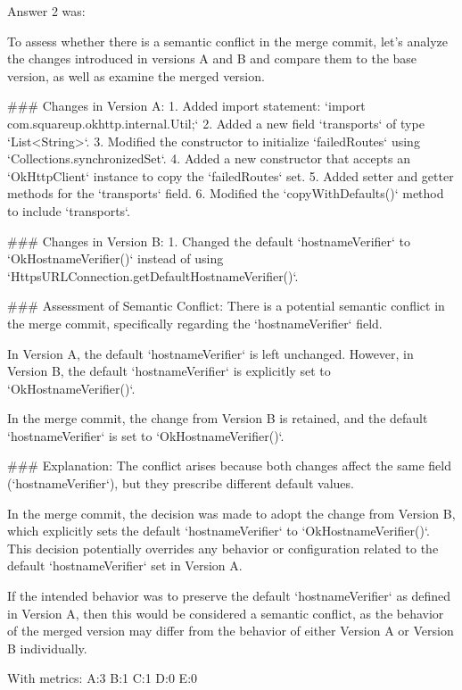 Answer 2 was:
\begin{spverbatim}
To assess whether there is a semantic conflict in the merge commit, let's analyze the changes introduced in versions A and B and compare them to the base version, as well as examine the merged version.

### Changes in Version A:
1. Added import statement: `import com.squareup.okhttp.internal.Util;`
2. Added a new field `transports` of type `List<String>`.
3. Modified the constructor to initialize `failedRoutes` using `Collections.synchronizedSet`.
4. Added a new constructor that accepts an `OkHttpClient` instance to copy the `failedRoutes` set.
5. Added setter and getter methods for the `transports` field.
6. Modified the `copyWithDefaults()` method to include `transports`.

### Changes in Version B:
1. Changed the default `hostnameVerifier` to `OkHostnameVerifier()` instead of using `HttpsURLConnection.getDefaultHostnameVerifier()`.

### Assessment of Semantic Conflict:
There is a potential semantic conflict in the merge commit, specifically regarding the `hostnameVerifier` field.

In Version A, the default `hostnameVerifier` is left unchanged. However, in Version B, the default `hostnameVerifier` is explicitly set to `OkHostnameVerifier()`.

In the merge commit, the change from Version B is retained, and the default `hostnameVerifier` is set to `OkHostnameVerifier()`.

### Explanation:
The conflict arises because both changes affect the same field (`hostnameVerifier`), but they prescribe different default values.

In the merge commit, the decision was made to adopt the change from Version B, which explicitly sets the default `hostnameVerifier` to `OkHostnameVerifier()`. This decision potentially overrides any behavior or configuration related to the default `hostnameVerifier` set in Version A.

If the intended behavior was to preserve the default `hostnameVerifier` as defined in Version A, then this would be considered a semantic conflict, as the behavior of the merged version may differ from the behavior of either Version A or Version B individually.
\end{spverbatim}

With metrics:
A:3
B:1
C:1
D:0
E:0

